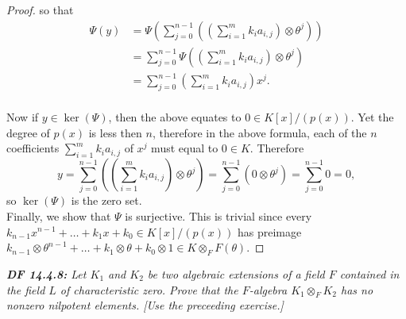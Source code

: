\documentclass{article}
\begin{document}
\begin{proof}
    so that
    \begin{align*}
      \Psi(y) &=\Psi\left( \sum_{j=0}^{n-1} \left(\left(\sum_{i=1}^m
        k_ia_{i,j}\right) \otimes \theta^j \right)\right)\\
      &=\sum_{j=0}^{n-1} \Psi \left(\left(\sum_{i=1}^m
        k_ia_{i,j}\right) \otimes \theta^j \right)\\
      &=\sum_{j=0}^{n-1} \left(\sum_{i=1}^m k_i a_{i,j}\right) x^j.\\
    \end{align*}

    Now if $y\in\ker(\Psi)$, then the above equates to $0\in K[x]/(p(x))$.
    Yet the degree of $p(x)$ is less then $n$, therefore in the above
    formula, each of the $n$ coefficients $\sum_{i=1}^m k_i a_{i,j}$ of
    $x^j$ must equal to $0\in K$. Therefore
    \[y =\sum_{j=0}^{n-1} \left(\left(\sum_{i=1}^m k_ia_{i,j}\right)
        \otimes \theta^j \right)
      =\sum_{j=0}^{n-1} \left(0 \otimes \theta^j \right)
      =\sum_{j=0}^{n-1} 0 =0,\]
    so $\ker(\Psi)$ is the zero set. \\

    Finally, we show that $\Psi$ is surjective. This is trivial since every
    $k_{n-1}x^{n-1}+\ldots+k_1x+k_0 \in K[x]/(p(x))$ has preimage
    $k_{n-1}\otimes \theta^{n-1}+\ldots+k_1\otimes \theta+k_0\otimes 1 \in
    K\otimes_F F(\theta)$.
  \end{proof}

\it \textbf{DF 14.4.8:} Let $K_1$ and $K_2$ be two algebraic extensions of
  a field $F$ contained in the field $L$ of characteristic zero. Prove that
  the $F$-algebra $K_1\otimes_F K_2$ has no nonzero nilpotent elements.
  [Use the preceeding exercise.]
\end{document}
